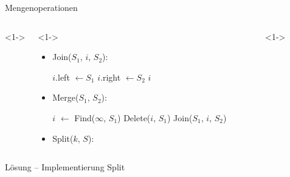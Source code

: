 \documentclass[t]{beamer}
\theoremstyle{plain}
\begin{document}
\begin{frame}{Mengenoperationen}
    \begin{columns}<1->
    \begin{column}{.65\textwidth}<1->
        \begin{itemize}
            \item<1> Join($S_1$, $i$, $S_2$):
                \begin{algorithm}[H]
                    $i$.left $\gets S_1$ \;
                    $i$.right $\gets S_2$ \;
                    \Return $i$
                \end{algorithm}
            \item<2> Merge($S_1$, $S_2$):
                \begin{algorithm}[H]
                    $i$ $\gets$ Find($\infty$, $S_1$) 
                    Delete($i$, $S_1$) \;
                    \Return Join($S_1$, $i$, $S_2$) \;
                \end{algorithm}
            \item<3> Split($k$, $S$):
                \begin{algorithm}[H]
                \end{algorithm}
        \end{itemize}
    \end{column}
    \begin{column}{.35\textwidth}<1->
    \end{column}
    \end{columns}
\end{frame}
\begin{frame}{Lösung -- Implementierung Split}
\end{frame}
\end{document}
